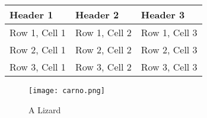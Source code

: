 \documentclass{article}
\begin{document}
\begin{table}[]
\begin{tabular}{|l|l|l|}
\hline
Header 1 & Header 2 & Header 3 \\
\hline
Row 1, Cell 1 & Row 1, Cell 2 & Row 1, Cell 3 \\
\hline
Row 2, Cell 1 & Row 2, Cell 2 & Row 2, Cell 3 \\
\hline
Row 3, Cell 1 & Row 3, Cell 2 & Row 3, Cell 3 \\
\hline
\end{tabular}
\end{table}


\begin{figure}[h]
    \centering
    \texttt{[image: carno.png]}
    \caption{A Lizard}
\end{figure}
\end{document}
